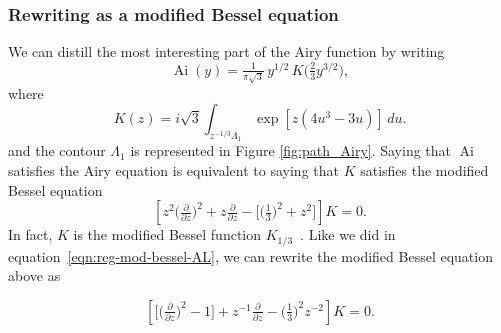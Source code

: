 \documentclass{article}
\DeclareMathOperator{\Ai}{Ai}
\theoremstyle{definition}
\theoremstyle{plain}
\begin{document}
{\subsubsection{Rewriting as a modified Bessel equation}
We can distill the most interesting part of the Airy function by writing
\[ \Ai(y) = \tfrac{1}{\pi\sqrt{3}}\,y^{1/2}\,K\big(\tfrac{2}{3} y^{3/2}\big), \]
where
\begin{equation}\label{integral:mod-bessel}
K(z) = i\sqrt{3} \int_{z^{-1/3}\Lambda_1} \exp\left[z \left(4u^3 - 3u\right)\right]\,du.
\end{equation}
and the contour $\Lambda_1$ is represented in Figure \ref{fig:path_Airy}.
Saying that $\Ai$ satisfies the Airy equation is equivalent to saying that $K$ satisfies the modified Bessel equation
\begin{equation}\label{eqn:mod-bessel-1/3}
\left[z^2 \big(\tfrac{\partial}{\partial z}\big)^2 + z \tfrac{\partial}{\partial z} - \big[\big(\tfrac{1}{3}\big)^2 + z^2\big]\right] K = 0.
\end{equation}
In fact, $K$ is the modified Bessel function $K_{1/3}$~\cite[equation~9.6.1]{dlmf}.
Like we did in equation~\eqref{eqn:reg-mod-bessel-AL}, we can rewrite the modified Bessel equation above as 

\begin{equation}\label{eqn:reg-mod-bessel}
\left[ \big[ \big(\tfrac{\partial}{\partial z}\big)^2 - 1 \big] + z^{-1} \tfrac{\partial}{\partial z} - \big(\tfrac{1}{3}\big)^2 z^{-2} \right] K = 0.
\end{equation}

}
\end{document}
